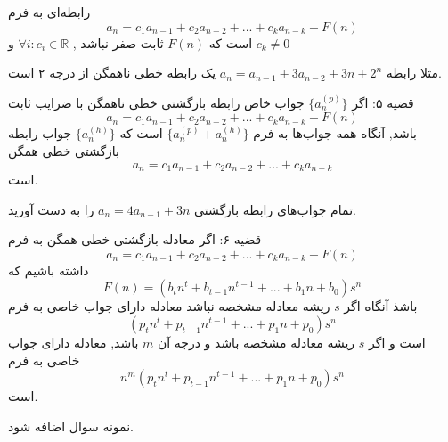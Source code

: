 \begin{definition}
    رابطه‌ای به فرم
   \[a_n=c_{1}a_{n-1}+c_{2}a_{n-2}+...+c_{k}a_{n-k}+F(n)\]
   است که
   $F(n)$
   ثابت صفر نباشد
   ,
   $\forall{i}:c_i \in \mathbb{R} $
   و 
   $ c_k\neq 0$

\end{definition}

مثلا رابطه‌ 
$a_n=a_{n-1}+3a_{n-2}+3n+2^n$
یک رابطه‌ خطی ناهمگن از درجه ۲ است.

\begin{theorem}
    قضیه ۵:
    اگر 
    $\{a^{(p)}_n\}$
    جواب خاص رابطه‌ بازگشتی خطی ناهمگن با ضرایب ثابت
    \[a_n=c_{1}a_{n-1}+c_{2}a_{n-2}+...+c_{k}a_{n-k}+F(n)\]
    باشد,
    آنگاه همه جواب‌ها به فرم 
    $\{a^{(p)}_n+a^{(h)}_n\}$
    است که
    $\{a^{(h)}_n\}$
    جواب رابطه‌ بازگشتی خطی همگن
    \[a_n=c_{1}a_{n-1}+c_{2}a_{n-2}+...+c_{k}a_{n-k}\]
    است.
\end{theorem}

\begin{problem}
    تمام جواب‌های رابطه‌ بازگشتی
    $a_n=4a_{n-1}+3n$
    را به دست آورید.
\end{problem}

\begin{theorem}
    قضیه ۶:
    اگر معادله بازگشتی خطی همگن به فرم
    \[a_n=c_{1}a_{n-1}+c_{2}a_{n-2}+...+c_{k}a_{n-k}+F(n)\]
    داشته باشیم که
    \[F(n)=(b_tn^t+b_{t-1}n^{t-1}+...+b_1n+b_0)s^n\]
    باشذ آنگاه اگر 
    $s$
    ریشه معادله مشخصه نباشد معادله دارای جواب خاصی به فرم
    \[(p_tn^t+p_{t-1}n^{t-1}+...+p_1n+p_0)s^n\]
    است و اگر
    $s$
    ریشه معادله مشخصه باشد و درجه آن 
    $m$
    باشد, معادله دارای جواب خاصی به فرم
    \[n^m(p_tn^t+p_{t-1}n^{t-1}+...+p_1n+p_0)s^n\]
    است.
\end{theorem}

\begin{problem}
    نمونه سوال اضافه شود.
\end{problem}